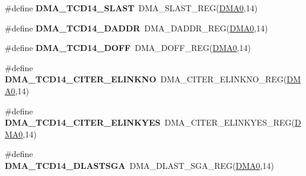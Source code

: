 \begin{DoxyCompactItemize}
\item 
\#define {\bfseries D\+M\+A\+\_\+\+T\+C\+D14\+\_\+\+S\+L\+A\+ST}~D\+M\+A\+\_\+\+S\+L\+A\+S\+T\+\_\+\+R\+EG(\hyperlink{group__DMA__Peripheral__Access__Layer_ga4103044f9ca209772f513dc694513ffb}{D\+M\+A0},14)\hypertarget{group__DMA__Register__Accessor__Macros_gacf0b581267dc9a83559b9f89655b6919}{}\label{group__DMA__Register__Accessor__Macros_gacf0b581267dc9a83559b9f89655b6919}

\item 
\#define {\bfseries D\+M\+A\+\_\+\+T\+C\+D14\+\_\+\+D\+A\+D\+DR}~D\+M\+A\+\_\+\+D\+A\+D\+D\+R\+\_\+\+R\+EG(\hyperlink{group__DMA__Peripheral__Access__Layer_ga4103044f9ca209772f513dc694513ffb}{D\+M\+A0},14)\hypertarget{group__DMA__Register__Accessor__Macros_gad1b405904b78f29167e9ca3ec3f67c05}{}\label{group__DMA__Register__Accessor__Macros_gad1b405904b78f29167e9ca3ec3f67c05}

\item 
\#define {\bfseries D\+M\+A\+\_\+\+T\+C\+D14\+\_\+\+D\+O\+FF}~D\+M\+A\+\_\+\+D\+O\+F\+F\+\_\+\+R\+EG(\hyperlink{group__DMA__Peripheral__Access__Layer_ga4103044f9ca209772f513dc694513ffb}{D\+M\+A0},14)\hypertarget{group__DMA__Register__Accessor__Macros_ga65c1a27d4fcad9497503d722426ea346}{}\label{group__DMA__Register__Accessor__Macros_ga65c1a27d4fcad9497503d722426ea346}

\item 
\#define {\bfseries D\+M\+A\+\_\+\+T\+C\+D14\+\_\+\+C\+I\+T\+E\+R\+\_\+\+E\+L\+I\+N\+K\+NO}~D\+M\+A\+\_\+\+C\+I\+T\+E\+R\+\_\+\+E\+L\+I\+N\+K\+N\+O\+\_\+\+R\+EG(\hyperlink{group__DMA__Peripheral__Access__Layer_ga4103044f9ca209772f513dc694513ffb}{D\+M\+A0},14)\hypertarget{group__DMA__Register__Accessor__Macros_ga15a7687794a55a2cdfbbf2601b9775a5}{}\label{group__DMA__Register__Accessor__Macros_ga15a7687794a55a2cdfbbf2601b9775a5}

\item 
\#define {\bfseries D\+M\+A\+\_\+\+T\+C\+D14\+\_\+\+C\+I\+T\+E\+R\+\_\+\+E\+L\+I\+N\+K\+Y\+ES}~D\+M\+A\+\_\+\+C\+I\+T\+E\+R\+\_\+\+E\+L\+I\+N\+K\+Y\+E\+S\+\_\+\+R\+EG(\hyperlink{group__DMA__Peripheral__Access__Layer_ga4103044f9ca209772f513dc694513ffb}{D\+M\+A0},14)\hypertarget{group__DMA__Register__Accessor__Macros_gabb6dadb79352c6af3a1e860d6a010a15}{}\label{group__DMA__Register__Accessor__Macros_gabb6dadb79352c6af3a1e860d6a010a15}

\item 
\#define {\bfseries D\+M\+A\+\_\+\+T\+C\+D14\+\_\+\+D\+L\+A\+S\+T\+S\+GA}~D\+M\+A\+\_\+\+D\+L\+A\+S\+T\+\_\+\+S\+G\+A\+\_\+\+R\+EG(\hyperlink{group__DMA__Peripheral__Access__Layer_ga4103044f9ca209772f513dc694513ffb}{D\+M\+A0},14)\hypertarget{group__DMA__Register__Accessor__Macros_ga7a9291c9148fe72fcaa6daf2a8fdd83e}{}\label{group__DMA__Register__Accessor__Macros_ga7a9291c9148fe72fcaa6daf2a8fdd83e}


\end{DoxyCompactItemize}
